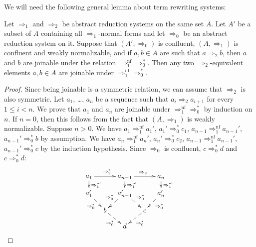\documentclass[reqno]{amsart}
\theoremstyle{definition}
\theoremstyle{remark}
\newcommand{\nf}{\mathrm{nf}}
\numberwithin{figure}{section}
\begin{document}
We will need the following general lemma about term rewriting systems:

\begin{lem}[conf-nf]
Let $\Rightarrow_1$ and $\Rightarrow_2$ be abstract reduction systems on the same set $A$.
Let $A'$ be a subset of $A$ containing all $\Rightarrow_1$-normal forms and let $\Rightarrow_0$ be an abstract reduction system on it.
Suppose that $(A',\Rightarrow_0)$ is confluent, $(A,\Rightarrow_1)$ is confluent and weakly normalizable,
and if $a,b \in A$ are such that $a \Rightarrow_2 b$, then $a$ and $b$ are joinable under the relation $\Rightarrow_1^\nf \Rightarrow_0^*$.
Then any two $\Rightarrow_2$-equivalent elements $a,b \in A$ are joinable under $\Rightarrow_1^\nf \Rightarrow_0^*$.
\end{lem}
\begin{proof}
Since being joinable is a symmetric relation, we can assume that $\Rightarrow_2$ is also symmetric.
Let $a_1$, \ldots, $a_n$ be a sequence such that $a_i \Rightarrow_2 a_{i+1}$ for every $1 \leq i < n$.
We prove that $a_1$ and $a_n$ are joinable under $\Rightarrow_1^\nf \Rightarrow_0^*$ by induction on $n$.
If $n = 0$, then this follows from the fact that $(A,\Rightarrow_1)$ is weakly normalizable.
Suppose $n > 0$.
We have $a_1 \Rightarrow_1^\nf a_1'$, $a_1' \Rightarrow_0^* c_1$, $a_{n-1} \Rightarrow_1^\nf a_{n-1}'$, $a_{n-1}' \Rightarrow_0^* b$ by assumption.
We have $a_n \Rightarrow_1^\nf a_n'$, $a_n' \Rightarrow_0^* c_2$, $a_{n-1} \Rightarrow_1^\nf a_{n-1}'$, $a_{n-1}' \Rightarrow_0^* c$ by the induction hypothesis.
Since $\Rightarrow_0$ is confluent, $c \Rightarrow_0^* d$ and $c \Rightarrow_0^* d$:
\[ \xymatrix@=1em{  a_1 \ar[rr]^{\Rightarrow_2^*} \ar@{-->}[d]^{\Rightarrow_1^\nf}  &                                   & a_{n-1} \ar[rr]^{\Rightarrow_2} \ar@{-->}[d]^{\Rightarrow_1^\nf}          &                                   & a_n \ar@{-->}[d]^{\Rightarrow_1^\nf}  \\
                    a_1' \ar@{-->}[rd]_{\Rightarrow_0^*}                            &                                   & a_{n-1}' \ar@{-->}[ld]_{\Rightarrow_0^*} \ar@{-->}[rd]^{\Rightarrow_0^*}  &                                   & a_n' \ar@{-->}[ld]^{\Rightarrow_0^*}  \\
                                                                                    & b \ar@{-->}[rd]_{\Rightarrow_0^*} &                                                                           & c \ar@{-->}[ld]^{\Rightarrow_0^*} &                                       \\
                                                                                    &                                   & d                                                                         &                                   &
                 } \]
\end{proof}
\end{document}
